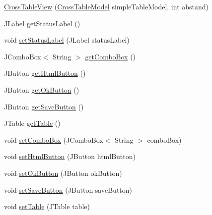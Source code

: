 \begin{DoxyCompactItemize}
\item 
\hyperlink{classde_1_1turnierverwaltung_1_1view_1_1_cross_table_view_adf904a29fc1e16870886bbcf2f4bf056}{Cross\+Table\+View} (\hyperlink{classde_1_1turnierverwaltung_1_1model_1_1_cross_table_model}{Cross\+Table\+Model} simple\+Table\+Model, int abstand)
\item 
J\+Label \hyperlink{classde_1_1turnierverwaltung_1_1view_1_1_cross_table_view_a084818041a5e2bc4662650f0581aabb3}{get\+Status\+Label} ()
\item 
void \hyperlink{classde_1_1turnierverwaltung_1_1view_1_1_cross_table_view_a1c7ce268930f88d8c5155d2a30bffb4b}{set\+Status\+Label} (J\+Label status\+Label)
\item 
J\+Combo\+Box$<$ String $>$ \hyperlink{classde_1_1turnierverwaltung_1_1view_1_1_cross_table_view_a95e3da38f1646b773d2c7cd95df4b0b1}{get\+Combo\+Box} ()
\item 
J\+Button \hyperlink{classde_1_1turnierverwaltung_1_1view_1_1_cross_table_view_a4d314d9754dcf5a78cb4a015fe561519}{get\+Html\+Button} ()
\item 
J\+Button \hyperlink{classde_1_1turnierverwaltung_1_1view_1_1_cross_table_view_a7b884a3d27c76c72f22a130fe90e1297}{get\+Ok\+Button} ()
\item 
J\+Button \hyperlink{classde_1_1turnierverwaltung_1_1view_1_1_cross_table_view_a84f8902333b20294f2f8f3c59d73200b}{get\+Save\+Button} ()
\item 
J\+Table \hyperlink{classde_1_1turnierverwaltung_1_1view_1_1_cross_table_view_a8e034e1df931db00f0ba4575c1d2fc75}{get\+Table} ()
\item 
void \hyperlink{classde_1_1turnierverwaltung_1_1view_1_1_cross_table_view_a4a73f869c5984ed5be163b378dd81785}{set\+Combo\+Box} (J\+Combo\+Box$<$ String $>$ combo\+Box)
\item 
void \hyperlink{classde_1_1turnierverwaltung_1_1view_1_1_cross_table_view_ae768fcd97172b65ecec804bb2be4e6e3}{set\+Html\+Button} (J\+Button html\+Button)
\item 
void \hyperlink{classde_1_1turnierverwaltung_1_1view_1_1_cross_table_view_a4722c4d550ed5b6e0c2566c5df691298}{set\+Ok\+Button} (J\+Button ok\+Button)
\item 
void \hyperlink{classde_1_1turnierverwaltung_1_1view_1_1_cross_table_view_aac66bd126aa4c8ac8c9d4ba51bbbbb65}{set\+Save\+Button} (J\+Button save\+Button)
\item 
void \hyperlink{classde_1_1turnierverwaltung_1_1view_1_1_cross_table_view_a6bca3da3eac0ad1ad76c0f2d89b13eb1}{set\+Table} (J\+Table table)
\end{DoxyCompactItemize}


